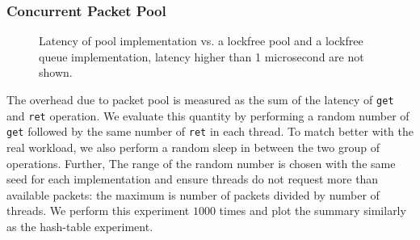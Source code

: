\subsubsection{Concurrent Packet Pool}
\begin{figure}[ht]
  \centering
  \caption{Latency of pool implementation vs. a lockfree pool and a lockfree queue
    implementation, latency higher than 1 microsecond are not shown\label{fig:pool}.}
  \end{figure}

The overhead due to packet pool is measured as the sum of the latency of
\texttt{get} and \texttt{ret} operation. We evaluate this quantity by
performing a random number of \texttt{get} followed by the same number of
\texttt{ret} in each thread. To match better with the real workload, we also
perform a random sleep in between the two group of operations. Further, The
range of the random number is chosen with the same seed for each implementation
and ensure threads do not request more than available packets: the maximum is
number of packets divided by number of threads. We perform this experiment
$1000$ times and plot the summary similarly as  the hash-table experiment.

